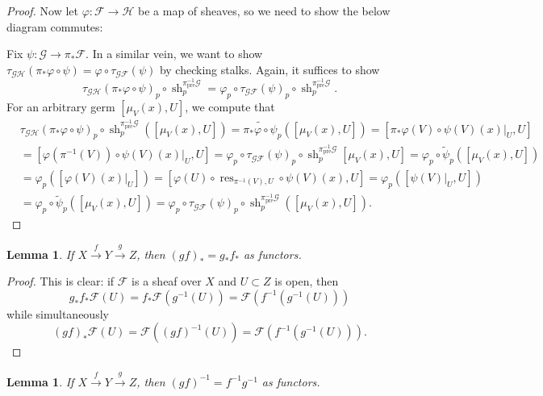 \documentclass{article}
\newcommand{\fF}{\mathscr{F}}
\newcommand{\fG}{\mathscr{G}}
\newcommand{\fH}{\mathscr{H}}
\DeclareMathOperator{\res}{\mathrm{res}}
\DeclareMathOperator{\pre}{\mathrm{pre}}
\DeclareMathOperator{\Mor}{\mathrm{Mor}}
\DeclareMathOperator{\sh}{sh}
\newtheorem{lemma}[theorem]{Lemma}
\begin{document}
\begin{proof}
    Now let $\varphi:\fF\to \fH$ be a map of sheaves, so we need to show the below diagram commutes:
    \begin{center}
    \end{center}
    Fix $\psi:\fG \to \pi_* \fF$. In a similar vein, we want to show $\tau_{\fG \fH} (\pi_* \varphi \circ \psi) = \varphi \circ \tau_{\fG \fF}(\psi)$ by checking stalks. Again, it suffices to show
    \[
    \tau_{\fG \fH} (\pi_* \varphi \circ \psi)_p \circ \sh^{\pi^{-1}_{\pre} \fG}_p = \varphi_p \circ \tau_{\fG \fF}(\psi)_p \circ \sh^{\pi^{-1}_{\pre} \fG}_p.
    \]
    For an arbitrary germ $[\mu_V(x),U]$, we compute that
    \begin{align*}
        &\tau_{\fG \fH} (\pi_* \varphi \circ \psi)_p \circ \sh^{\pi^{-1}_{\pre} \fG}_p([\mu_V(x),U])=\widetilde{\pi_* \varphi \circ \psi}_p([\mu_V(x),U])=[\pi_*\varphi(V)\circ \psi(V)(x)\vert_U,U]\\
        &=[\varphi(\pi^{-1}(V)) \circ \psi(V)(x)\vert_U,U]=\varphi_p\circ \tau_{\fG \fF}(\psi)_p\circ \sh_p^{\pi^{-1}_{\pre}\fG}[\mu_V(x),U]=\varphi_p \circ \tilde \psi_p([\mu_V(x),U])\\
        &= \varphi_p([\varphi(V)(x)\vert_U])=[\varphi(U)\circ \res_{\pi^{-1}(V),U}\circ \psi(V)(x),U]=\varphi_p([\psi(V)\vert_U,U])\\
        &=\varphi_p\circ \tilde \psi_p([\mu_V(x),U])=\varphi_p \circ \tau_{\fG \fF}(\psi)_p \circ \sh^{\pi^{-1}_{\pre} \fG}_p([\mu_V(x),U]).
    \end{align*}
\end{proof}
\begin{lemma} \label{lem:pushforward sheaf distributes}
        If $X\xrightarrow{f}Y\xrightarrow{g}Z$, then $(gf)_* = g_*f_*$ as functors.
    \end{lemma}
    \begin{proof}
        This is clear: if $\fF$ is a sheaf over $X$ and $U\subset Z$ is open, then
        \[
        g_*f_*\fF(U)=f_* \fF(g^{-1}(U))=\fF(f^{-1}(g^{-1}(U)))
        \]
        while simultaneously
        \[
        (gf)_*\fF(U)=\fF((gf)^{-1}(U))=\fF(f^{-1}(g^{-1}(U))).
        \]
    \end{proof}
    \begin{lemma} \label{lem:inverse image sheaf distributes}
        If $X\xrightarrow{f}Y\xrightarrow{g}Z$, then $(gf)^{-1} = f^{-1}g^{-1}$ as functors.
    \end{lemma}
\end{document}
